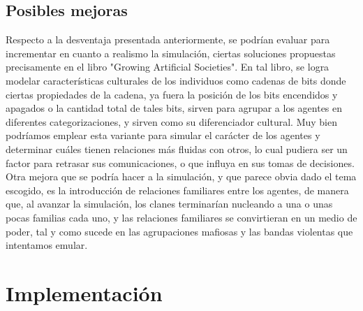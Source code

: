 \documentclass[11pt]{article}
\begin{document}
\subsection{Posibles mejoras}
Respecto a la desventaja presentada anteriormente, se podrían evaluar para incrementar en cuanto a realismo la simulación, ciertas soluciones propuestas precisamente en el libro "Growing Artificial Societies". En tal libro, se logra modelar características culturales de los individuos como cadenas de bits donde ciertas propiedades de la cadena, ya fuera la posición de los bits encendidos y apagados o la cantidad total de tales bits, sirven para agrupar a los agentes en diferentes categorizaciones, y sirven como su diferenciador cultural. Muy bien podríamos emplear esta variante para simular el carácter de los agentes y determinar cuáles tienen relaciones más fluidas con otros, lo cual pudiera ser un factor para retrasar sus comunicaciones, o que influya en sus tomas de decisiones.
Otra mejora que se podría hacer a la simulación, y que parece obvia dado el tema escogido, es la introducción de relaciones familiares entre los agentes, de manera que, al avanzar la simulación, los clanes terminarían nucleando a una o unas pocas familias cada uno, y las relaciones familiares se convirtieran en un medio de poder, tal y como sucede en las agrupaciones mafiosas y las bandas violentas que intentamos emular.

\section{Implementación}
\end{document}
